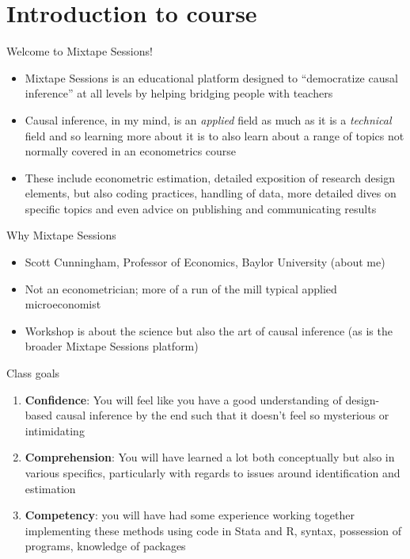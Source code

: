 \documentclass{beamer}
\begin{document}




\section{Introduction to course}

\begin{frame}{Welcome to Mixtape Sessions!}

  \begin{itemize}
    \item Mixtape Sessions is an educational platform designed to ``democratize causal inference'' at all levels by helping bridging people with teachers
    \item Causal inference, in my mind, is an \emph{applied} field as much as it is a \emph{technical} field and so learning more about it is to also learn about a range of topics not normally covered in an econometrics course
    \item These include econometric estimation, detailed exposition of research design elements, but also coding practices, handling of data, more detailed dives on specific topics and even advice on publishing and communicating results
  \end{itemize}

\end{frame}

\begin{frame}{Why Mixtape Sessions}

  \begin{itemize}

    \item Scott Cunningham, Professor of Economics, Baylor University (about me)
    \item Not an econometrician; more of a run of the mill typical applied microeconomist
    \item Workshop is about the science but also the art of causal inference (as is the broader Mixtape Sessions platform)

  \end{itemize}

\end{frame}

\begin{frame}{Class goals}

  \begin{enumerate}
    \item \textbf{Confidence}: You will feel like you have a good understanding of design-based causal inference by the end such that it doesn't feel so mysterious or intimidating
    \item \textbf{Comprehension}: You will have learned a lot both conceptually but also in various specifics, particularly with regards to issues around identification and estimation
    \item \textbf{Competency}: you will have had some experience working together implementing these methods using code in Stata and R, syntax, possession of programs, knowledge of packages
  \end{enumerate}

\end{frame}
\end{document}
